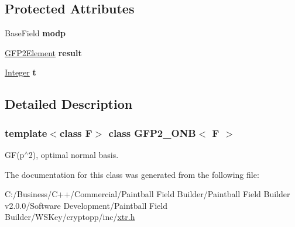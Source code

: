 \subsection*{Protected Attributes}
\begin{DoxyCompactItemize}
\item 
\hypertarget{class_g_f_p2___o_n_b_a12a3de839303bf309ed57d38659a85a9}{
BaseField {\bfseries modp}}
\label{class_g_f_p2___o_n_b_a12a3de839303bf309ed57d38659a85a9}

\item 
\hypertarget{class_g_f_p2___o_n_b_a4a8985727330598468dfbeb04cad772d}{
\hyperlink{class_g_f_p2_element}{GFP2Element} {\bfseries result}}
\label{class_g_f_p2___o_n_b_a4a8985727330598468dfbeb04cad772d}

\item 
\hypertarget{class_g_f_p2___o_n_b_a69c8bc73d2d4a07ba6df46b12c8e7913}{
\hyperlink{class_integer}{Integer} {\bfseries t}}
\label{class_g_f_p2___o_n_b_a69c8bc73d2d4a07ba6df46b12c8e7913}

\end{DoxyCompactItemize}


\subsection{Detailed Description}
\subsubsection*{template$<$class F$>$ class GFP2\_\-ONB$<$ F $>$}

GF(p$^\wedge$2), optimal normal basis. 

The documentation for this class was generated from the following file:\begin{DoxyCompactItemize}
\item 
C:/Business/C++/Commercial/Paintball Field Builder/Paintball Field Builder v2.0.0/Software Development/Paintball Field Builder/WSKey/cryptopp/inc/\hyperlink{xtr_8h}{xtr.h}\end{DoxyCompactItemize}
